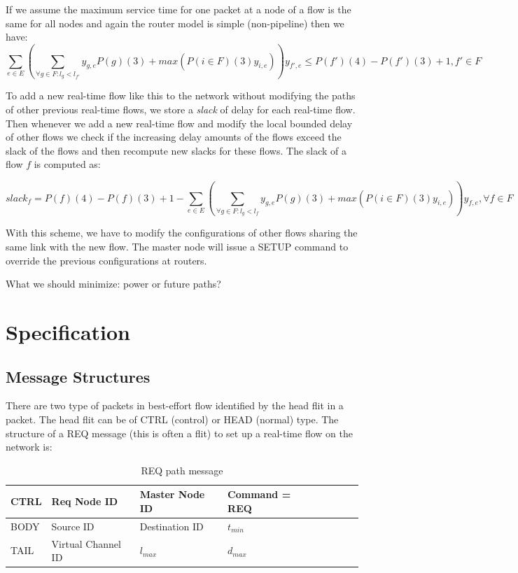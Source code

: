 \documentclass[a4]{article}
\begin{document}
If we assume the maximum service time for one packet at a node of a flow is the same
for all nodes and again the router model is simple (non-pipeline) then we have:
\begin{equation}\label{equ:e2eDelayNewPath2}
\sum_{e \in E} (\sum_{\forall g \in F:l_g <
l_{f'}}y_{g,e}P(g)(3)+max(P(i \in F)(3)y_{i,e}))y_{f',e} \leq P(f')(4)-P(f')(3)
+ 1, f' \in F
\end{equation}

To add a new real-time flow like this to the network without modifying the paths
of other previous real-time flows, we store a {\em slack} of delay for each
real-time flow. Then whenever we add a new real-time flow and modify the local
bounded delay of other flows we check if the increasing delay amounts of the
flows exceed the slack of the flows and then recompute new slacks for these
flows. The slack of a flow $f$ is computed as:

\begin{equation}
	slack_f=P(f)(4)-P(f)(3) +
1 - \sum_{e \in E} (\sum_{\forall g \in F:l_g <
l_{f}}y_{g,e}P(g)(3)+max(P(i \in F)(3)y_{i,e}))y_{f,e}, \forall f \in F
\end{equation}

With this scheme, we have to modify the configurations of other flows sharing
the same link with the new flow. The master node will issue a SETUP command to
override the previous configurations at routers.

What we should minimize: power or future paths?

\section{Specification}
\subsection{Message Structures}

There are two type of packets in best-effort flow identified by the head flit
in a packet. The head flit can be of CTRL (control) or HEAD (normal) type. The
structure of a REQ message (this is often a flit) to set up a real-time flow on the network is:

\begin{table}[htbp]
\begin{center}
  \begin{tabular}{ | l | l | l | l | l | l | l | l | }
    \hline
	CTRL & Req Node ID & Master Node ID & Command = REQ \\ \hline
	BODY & Source ID & Destination ID & $t_{min}$ \\ \hline 
	TAIL & Virtual Channel ID & $l_{max}$ & $d_{max}$ \\
    \hline
  \end{tabular}
\end{center}
\caption{REQ path message}
\label{table:PathMsg}
\end{table}
\end{document}

